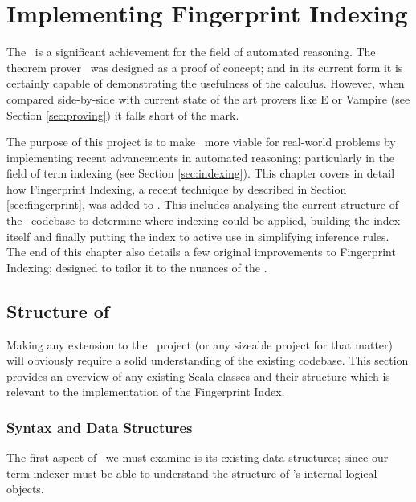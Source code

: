 
\chapter{Implementing Fingerprint Indexing}
\label{cha:method}

The \HSWAC\ is a significant achievement for the field of automated reasoning.
The theorem prover \beagle\ was designed as a proof of concept; and in its
current form it is certainly capable of demonstrating the
usefulness of the calculus. However, when compared side-by-side with current
state of the art provers like E or Vampire (see Section \ref{sec:proving}) it falls short
of the mark.

The purpose of this project is to make \beagle\ more viable for real-world problems
by implementing recent advancements in automated reasoning; particularly in the
field of term indexing (see Section \ref{sec:indexing}). This chapter covers in
detail how Fingerprint Indexing, a recent technique by  described
in Section \ref{sec:fingerprint}, was added to \beagle. This includes analysing
the current structure of the \beagle\ codebase to determine where indexing could
be applied, building the index itself and finally putting the index to active use
in simplifying inference rules. The end of this chapter also details a few
original improvements to Fingerprint Indexing; designed to tailor it to the nuances
of the \HSWAC.

\section{Structure of \Beagle}
\label{sec:initial}

Making any extension to the \beagle\ project (or any sizeable project
for that matter) will obviously require a solid
understanding of the existing codebase. This section provides an overview
of any existing Scala classes and their structure which is relevant to the implementation of the Fingerprint Index.

\subsection{Syntax and Data Structures}

The first aspect of \beagle\ we must examine is its existing data structures;
since our term indexer must be able to understand the structure of \beagle's internal
logical objects.

